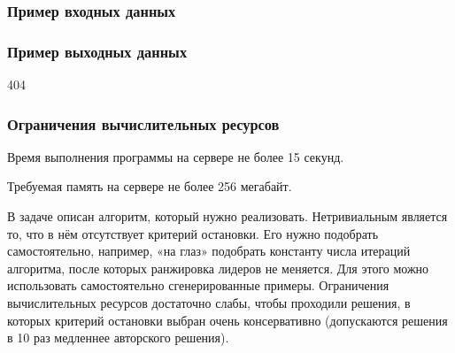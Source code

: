\subsubsection*{Пример входных данных}

\noindent[(0, 200), (0, 399), (0, 499), (0, 303), (0, 104), (0, 90), (0, 60), (0, 410), 
(0, 272), (0, 9), (336, 109), (387, 139), (78, 77), (480, 225), (273, 189), (58, 395), 
$\cdots$ ]

\subsubsection*{Пример выходных данных}

404

\subsubsection*{Ограничения вычислительных ресурсов}

Время выполнения программы на сервере не более 15 секунд.

Требуемая память на сервере не более 256 мегабайт.

\solutionSection

В задаче описан алгоритм, который нужно реализовать. Нетривиальным является то, что в нём отсутствует критерий остановки. Его нужно подобрать самостоятельно, например, «на глаз» подобрать константу числа итераций алгоритма, после которых ранжировка лидеров не меняется. Для этого можно использовать самостоятельно сгенерированные примеры. Ограничения вычислительных ресурсов достаточно слабы, чтобы проходили решения, в которых критерий остановки выбран очень консервативно (допускаются решения в 10 раз медленнее авторского решения).

